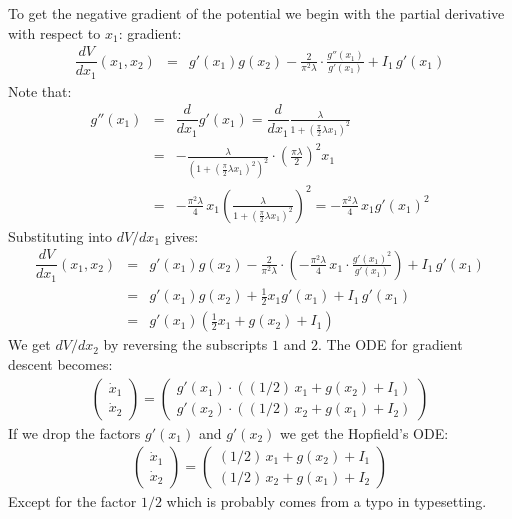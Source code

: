  To get the negative gradient of the potential we begin with the partial 
derivative with respect to $x_1$: gradient:
\begin{eqnarray*}
\dfrac{dV}{d x_1}(x_1, x_2) &=& g'(x_1) g(x_2) - \frac{2}{\pi^2 \lambda}
\cdot \frac{g''(x_1)}{g'(x_1)}
+ I_1 \, g'(x_1) 
\end{eqnarray*}
Note that:
\begin{eqnarray*}
g''(x_1) &=& \dfrac{d}{d x_1} g'(x_1) = \dfrac{d}{d x_1} 
\frac{\lambda}{1+ \left(\displaystyle{\frac{\pi}{2}}\lambda x_1\right)^2 } \\
~ &=& - \frac{\lambda}{\left(1+ 
\left(\displaystyle{\frac{\pi}{2}}\lambda x_1\right)^2 \right)^2} \cdot 
\left(\frac{\pi \lambda}{2}\right)^2 x_1 \\
 ~ &=& -\frac{\pi^2 \lambda}{4} \, x_1 \left( 
\frac{\lambda}{1+ \left(\displaystyle{\frac{\pi}{2}}\lambda x_1\right)^2 } 
\right)^2 = -\frac{\pi^2 \lambda}{4} \, x_1 g'(x_1)^2
\end{eqnarray*}
Substituting into $dV/dx_1$ gives:
\begin{eqnarray*}
\dfrac{dV}{d x_1}(x_1, x_2) &=& g'(x_1) g(x_2) - \frac{2}{\pi^2 \lambda}
\cdot \left(-\frac{\pi^2 \lambda}{4} \, x_1 \cdot \frac{g'(x_1)^2}{g'(x_1)} \right)
+ I_1 \, g'(x_1) \\
~ &=& g'(x_1) g(x_2) + \frac{1}{2} x_1 g'(x_1) + I_1 \, g'(x_1) \\
~ &=& g'(x_1) \left(\frac{1}{2} x_1  + g(x_2) + I_1\right) 
\end{eqnarray*}
We get $dV/dx_2$ by reversing the subscripts $1$ and $2$.  The ODE for 
gradient descent becomes:
\begin{eqnarray*}
\begin{pmatrix}
\dot{x}_1 \\ \dot{x}_2 
\end{pmatrix}
=
\begin{pmatrix}
g'(x_1) \cdot \left( (1/2) \, x_1  + g(x_2) + I_1\right)  \\[2mm]
g'(x_2) \cdot \left( (1/2) \,  x_2  + g(x_1) + I_2\right) 
\end{pmatrix}
\end{eqnarray*}
If we drop the factors $g'(x_1)$ and $g'(x_2)$ we get the Hopfield's ODE:
\begin{eqnarray*}
\begin{pmatrix}
\dot{x}_1 \\ \dot{x}_2 
\end{pmatrix}
=
\begin{pmatrix}
 (1/2) \, x_1  + g(x_2) + I_1  \\[2mm]
 (1/2) \,  x_2  + g(x_1) + I_2 
\end{pmatrix}
\end{eqnarray*}
Except for the factor $1/2$ which is probably comes from a typo in typesetting.
